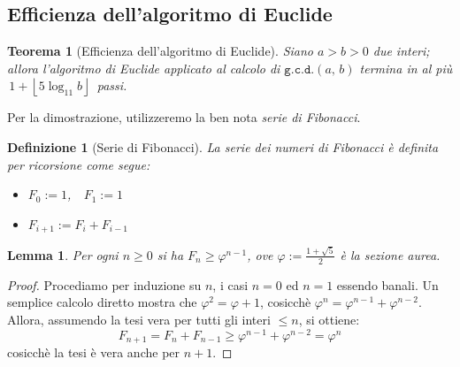\documentclass[pdflatex,11pt,a4paper,oneside]{article}
\let\gold=\varphi
\newcommand{\floor}[1]{\left\lfloor{#1}\right\rfloor}
\newcommand{\gcdop}[0]{\ensuremath{\mathtt{g.c.d.}}}
\newcommand{\xgcd}[1]{\ensuremath{\gcdop\left({#1}\right)}}
\renewcommand{\gcd}[2]{\xgcd{{#1},\,{#2}}}
\newtheorem{theorem}[TheoremLike]{Teorema}
\newtheorem{definition}[TheoremLike]{Definizione}
\newtheorem{lemma}[TheoremLike]{Lemma}
\begin{document}

\subsection{Efficienza dell'algoritmo di Euclide}

\begin{theorem}[Efficienza dell'algoritmo di Euclide]
Siano $a > b > 0$ due interi; allora l'algoritmo di Euclide
applicato al calcolo di $\gcd{a}{b}$ termina in al pi\`u
\,$1 + \floor{5 \log_{11} b}$\, passi.
\end{theorem}

\smallskip
\noindent
Per la dimostrazione, utilizzeremo la ben nota \emph{serie di Fibonacci}.

\begin{definition}[Serie di Fibonacci]
La serie dei numeri di Fibonacci \`e definita per ricorsione come segue:
  \begin{itemize}
    \item $F_0 := 1$,~~$F_1 := 1$
    \item $F_{i+1} := F_i + F_{i-1}$
  \end{itemize}
\end{definition}

\begin{lemma}
Per ogni $n \geq 0$ si ha $F_n \geq \gold^{n-1}$, ove $\gold :=
\frac{1 + \sqrt{5}}{2}$ \`e la sezione aurea.
\end{lemma}
%
\begin{proof}
Procediamo per induzione su $n$, i casi $n = 0$ ed $n = 1$ essendo banali.
Un semplice calcolo diretto mostra che $\gold^2 = \gold + 1$, cosicch\`e
$\gold^{n} = \gold^{n-1} + \gold^{n-2}$.  Allora, assumendo la tesi vera
per tutti gli interi $\leq n$, si ottiene:
  $$F_{n+1} = F_n + F_{n-1} \geq \gold^{n-1} + \gold^{n-2} = \gold^{n}$$
cosicch\`e la tesi \`e vera anche per $n + 1$.
\end{proof}
\end{document}

